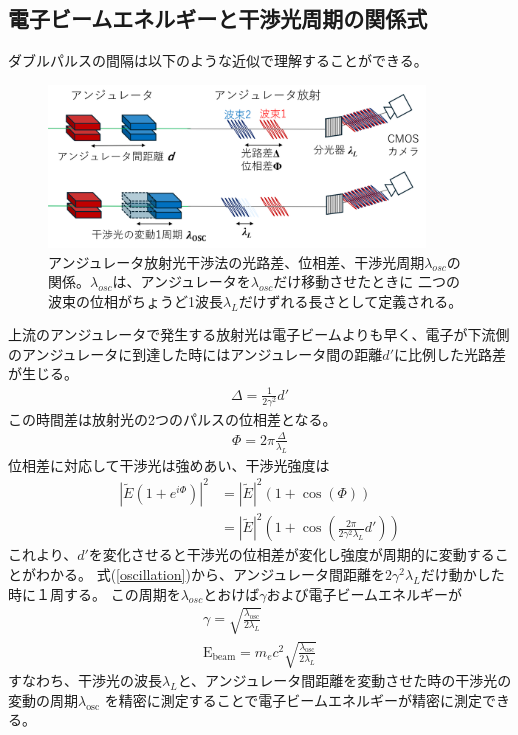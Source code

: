 \documentclass[a4paper,11pt,uplatex]{jsbook}
\begin{document}
\subsection{電子ビームエネルギーと干渉光周期の関係式}\label{sec:interference}
ダブルパルスの間隔は以下のような近似で理解することができる。
\begin{figure}[h]
  \centering
  \includegraphics[width=10cm]{image/2-lambdaosc.png}
  \caption{アンジュレータ放射光干渉法の光路差、位相差、干渉光周期$\lambda_{osc}$の関係。$\lambda_{osc}$は、アンジュレータを$\lambda_{osc}$だけ移動させたときに
  二つの波束の位相がちょうど1波長$\lambda_L$だけずれる長さとして定義される。}
\end{figure}
上流のアンジュレータで発生する放射光は電子ビームよりも早く、電子が下流側のアンジュレータに到達した時にはアンジュレータ間の距離$d'$に比例した光路差が生じる。
\begin{eqnarray}
  \Delta = \frac{1}{2\gamma^2}d' \label{path shift}
\end{eqnarray}
この時間差は放射光の2つのパルスの位相差となる。
\begin{eqnarray}
  \Phi = 2\pi \frac{\Delta}{\lambda_L}
\end{eqnarray}
位相差に対応して干渉光は強めあい、干渉光強度は
\begin{eqnarray}
  |\tilde{E} \left( 1+ e^{i\Phi}\right)|^2 
&= |\tilde{E}|^2 \left( 1 + \cos(\Phi) \right)\\
&= |\tilde{E}|^2 \left( 1 + \cos(\frac{2\pi}{2\gamma^2\lambda_L}d') \right) 
  \label{oscillation}
\end{eqnarray}
これより、$d'$を変化させると干渉光の位相差が変化し強度が周期的に変動することがわかる。
式(\ref{oscillation})から、アンジュレータ間距離を$2\gamma^2\lambda_L$だけ動かした時に１周する。
この周期を$\lambda_{osc}$とおけば$\gamma$および電子ビームエネルギーが
\begin{eqnarray}
  \gamma = \sqrt{\frac{\lambda_{\text{osc}}}{2\lambda_L}}\\
  \text{E}_\text{beam} =m_e c^2  \sqrt{\frac{\lambda_{\text{osc}}}{2\lambda_L}} \label{zero order energy formula}
\end{eqnarray}
すなわち、干渉光の波長$\lambda_L$と、アンジュレータ間距離を変動させた時の干渉光の変動の周期$\lambda_{\text{osc}}$
を精密に測定することで電子ビームエネルギーが精密に測定できる。
\end{document}
